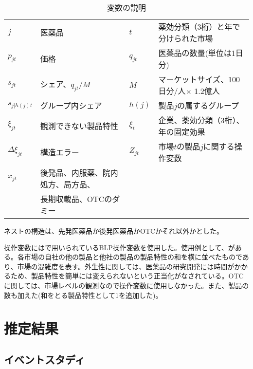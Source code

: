 \documentclass[a4paper,11pt,uplatex]{jsarticle}
\theoremstyle{definition}
\begin{document}
\begin{table}[H]\centering \caption{変数の説明}
    \small
    \begin{tabular}{llll}
        \toprule \label{tab:demand_}
        \(j\) & 医薬品&$t$ &薬効分類（3桁）と年で分けられた市場 \\
        $p_{jt}$ &価格 & $q_{jt}$ &医薬品の数量(単位は1日分)\\ 
        $s_{jt}$ &シェア、$q_{jt}/M$ & $M$ &マーケットサイズ、100日分/人$\times$ 1.2億人\\
        $s_{j|h(j)t}$ & グループ内シェア & $h(j)$ &製品\(j\)の属するグループ\\
        $\xi_{jt}$ & 観測できない製品特性& $\xi_t$ &企業、薬効分類（3桁）、年の固定効果 \\
        $\Delta \xi_{jt}$ & 構造エラー &$Z_{jt}$ &市場\(t\)の製品\(j\)に関する操作変数 \\
        $x_{jt}$ & 後発品、内服薬、院内処方、局方品、& &  \\
         & 長期収載品、OTCのダミー & &\\
         \bottomrule
    \end{tabular}
\end{table}
ネストの構造は、先発医薬品か後発医薬品かOTCかそれ以外かとした。

操作変数には\cite{BLP}で用いられているBLP操作変数を使用した。使用例として、\cite{Iizuka2007}がある。各市場の自社の他の製品と他社の製品の製品特性の和を横に並べたものであり、市場の混雑度を表す。外生性に関しては、医薬品の研究開発には時間がかかるため、製品特性を簡単には変えられないという正当化がなされている。OTCに関しては、市場レベルの観測なので操作変数に使用しなかった。また、製品の数も加えた(和をとる製品特性として1を追加した)。

\section{推定結果} 
\subsection{イベントスタディ}
\end{document}
